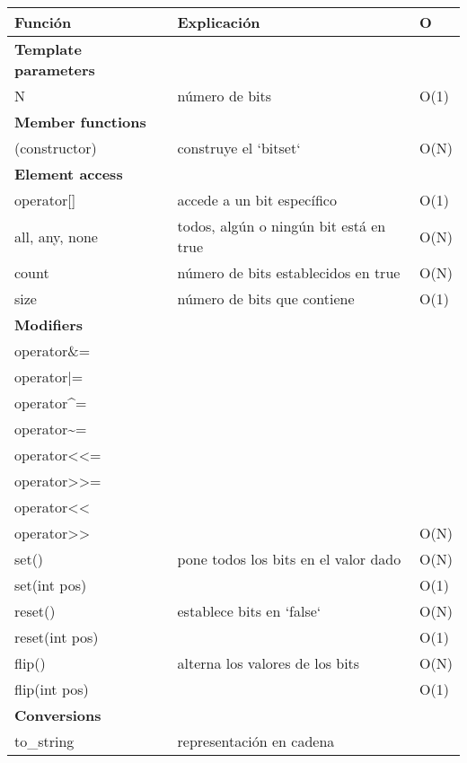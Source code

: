 \begin{center}
    \begin{tabular}{||l|l|l||}
    \hline
    \textbf{Función}    & \textbf{Explicación}          & \textbf{O} \\ \hline

    \textbf{Template parameters} & & \\ \hline
        N               & número de bits             & O(1) \\ \hline

    \textbf{Member functions} & & \\ \hline
    (constructor) & construye el `bitset` & O(N) \\ \hline

    \textbf{Element access} & & \\ \hline
    operator[]          & accede a un bit específico    & O(1) \\ \hline
    all, any, none      & todos, algún o ningún bit está en true  & O(N) \\ \hline
    count               & número de bits establecidos en true     & O(N) \\ \hline
    size                & número de bits que contiene & O(1) \\ \hline

    \textbf{Modifiers} & & \\ \hline
        operator\&=  & & \\
        operator|= & & \\
        operator\textasciicircum= & & \\
        operator\textasciitilde= & & \\
        operator<<= & & \\
        operator>>= & & \\
        operator<< & & \\
        operator>> & & O(N) \\ \hline
        set() & pone todos los bits en el valor dado        & O(N) \\
        set(int pos) &                                      & O(1) \\ \hline
        reset() & establece bits en `false`                 & O(N) \\
        reset(int pos) &                                    & O(1) \\ \hline
        flip() & alterna los valores de los bits            & O(N) \\
        flip(int pos) & &O(1) \\ \hline

    \textbf{Conversions} & & \\ \hline
    to\_string & representación en cadena
    \end{tabular}
\end{center}
